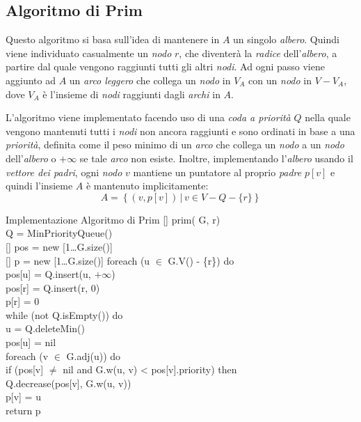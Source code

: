 \subsection{Algoritmo di Prim}
Questo algoritmo si basa sull'idea di mantenere in $A$ un singolo \emph{albero}.
Quindi viene individuato casualmente un \emph{nodo} $r$, che diventerà la
\emph{radice} dell'\emph{albero}, a partire dal quale vengono raggiunti tutti
gli altri \emph{nodi}. Ad ogni passo viene aggiunto ad $A$ un \emph{arco
leggero} che collega un \emph{nodo} in $V_A$ con un \emph{nodo} in $V-V_A$,
dove $V_A$ è l'insieme di \emph{nodi} raggiunti dagli \emph{archi} in $A$.

L'algoritmo viene implementato facendo uso di una \emph{coda a priorità} $Q$
nella quale vengono mantenuti tutti i \emph{nodi} non ancora raggiunti e sono
ordinati in base a una \emph{priorità}, definita come il peso minimo di un
\emph{arco} che collega un \emph{nodo} a un \emph{nodo} dell'\emph{albero} o
$+\infty$ se tale \emph{arco} non esiste. Inoltre, implementando l'\emph{albero}
usando il \emph{vettore dei padri}, ogni \emph{nodo} $v$ mantiene un puntatore
al proprio \emph{padre} $p[v]$ e quindi l'insieme $A$ è mantenuto implicitamente:
\[A=\left\{(v,p[v])\,|\,v\in V-Q-\{r\}\right\}\]

\begin{minicode}{Implementazione Algoritmo di Prim}
\ind{}[] prim( G,  r)\\
     Q = MinPriorityQueue()\\
    [] pos = new [1\dots G.size()]\\
    [] p = new [1\dots G.size()]\hfill{}
    \indf foreach (u $\in$ G.V() - \{r\}) do\\
        pos[u] = Q.insert(u, $+\infty$)\\
    \indf pos[r] = Q.insert(r, 0)\\
    \indf p[r] = 0\\
    \indf while (not Q.isEmpty()) do\\
         u = Q.deleteMin()\\
        pos[u] = nil\\
        \indff foreach (v $\in$ G.adj(u)) do\\
            \indfff if (pos[v] $\neq$ nil and G.w(u, v) < pos[v].priority) then\\
                Q.decrease(pos[v], G.w(u, v))\\
                p[v] = u\\
    \indf return p
\end{minicode}

